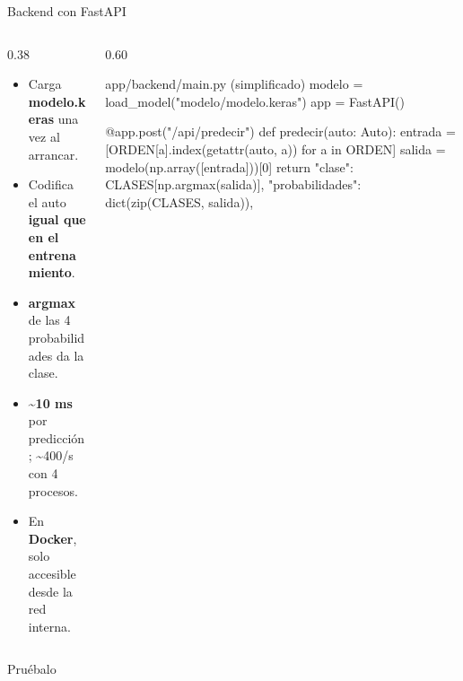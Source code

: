 \documentclass[10pt,aspectratio=169]{beamer}
\begin{document}
\begin{frame}[fragile]{Backend con FastAPI}
  \begin{columns}[c]
    \begin{column}{0.38\textwidth}
      \small
      \begin{itemize}
        \setlength{\itemsep}{0.5em}
        \item Carga \textbf{modelo.keras} una vez al arrancar.
        \item Codifica el auto \textbf{igual que en el entrenamiento}.
        \item \textbf{argmax} de las 4 probabilidades da la clase.
        \item \textbf{\textasciitilde10 ms} por predicción;
              \textasciitilde400/s con 4 procesos.
        \item En \textbf{Docker}, solo accesible desde la red interna.
      \end{itemize}
    \end{column}
    \begin{column}{0.60\textwidth}
\begin{codigo}{app/backend/main.py (simplificado)}
modelo = load_model("modelo/modelo.keras")
app = FastAPI()

@app.post("/api/predecir")
def predecir(auto: Auto):
    entrada = [ORDEN[a].index(getattr(auto, a))
               for a in ORDEN]
    salida = modelo(np.array([entrada]))[0]
    return {
        "clase": CLASES[np.argmax(salida)],
        "probabilidades": dict(zip(CLASES, salida)),
    }
\end{codigo}
    \end{column}
  \end{columns}
\end{frame}

\begin{frame}{Pruébalo}
  \vfill
  \centering
  \vfill
\end{frame}
\end{document}
